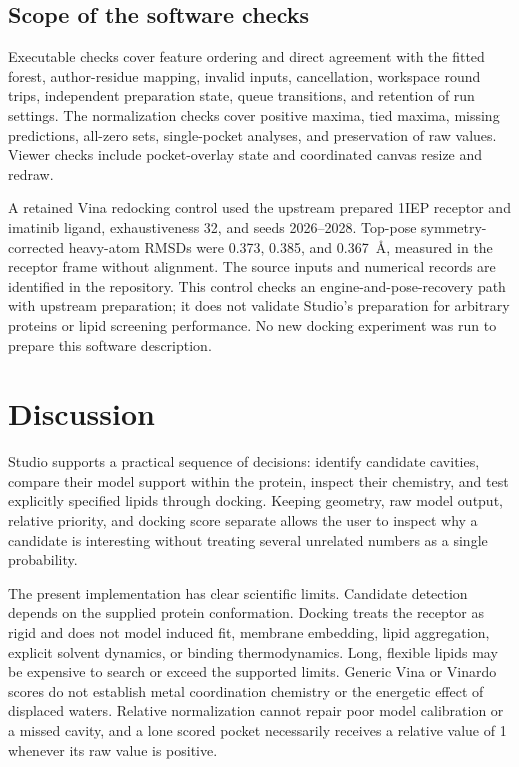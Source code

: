 \documentclass[10pt,a4paper]{article}
\begin{document}
\subsection{Scope of the software checks}
Executable checks cover feature ordering and direct agreement with the fitted forest, author-residue mapping, invalid inputs, cancellation, workspace round trips, independent preparation state, queue transitions, and retention of run settings. The normalization checks cover positive maxima, tied maxima, missing predictions, all-zero sets, single-pocket analyses, and preservation of raw values. Viewer checks include pocket-overlay state and coordinated canvas resize and redraw.

A retained Vina redocking control used the upstream prepared 1IEP receptor and imatinib ligand, exhaustiveness 32, and seeds 2026--2028. Top-pose symmetry-corrected heavy-atom RMSDs were 0.373, 0.385, and 0.367~\AA, measured in the receptor frame without alignment. The source inputs and numerical records are identified in the repository. This control checks an engine-and-pose-recovery path with upstream preparation; it does not validate Studio's preparation for arbitrary proteins or lipid screening performance. No new docking experiment was run to prepare this software description.

\section{Discussion}
Studio supports a practical sequence of decisions: identify candidate cavities, compare their model support within the protein, inspect their chemistry, and test explicitly specified lipids through docking. Keeping geometry, raw model output, relative priority, and docking score separate allows the user to inspect why a candidate is interesting without treating several unrelated numbers as a single probability.

The present implementation has clear scientific limits. Candidate detection depends on the supplied protein conformation. Docking treats the receptor as rigid and does not model induced fit, membrane embedding, lipid aggregation, explicit solvent dynamics, or binding thermodynamics. Long, flexible lipids may be expensive to search or exceed the supported limits. Generic Vina or Vinardo scores do not establish metal coordination chemistry or the energetic effect of displaced waters. Relative normalization cannot repair poor model calibration or a missed cavity, and a lone scored pocket necessarily receives a relative value of 1 whenever its raw value is positive.
\end{document}
